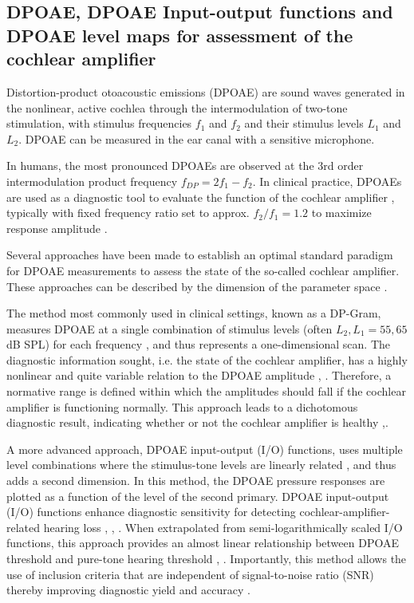\documentclass[journal,twoside,web]{ieeecolor2}
\begin{document}
\subsection{DPOAE, DPOAE Input-output functions and DPOAE level maps for assessment of the cochlear amplifier}
Distortion-product otoacoustic emissions (DPOAE) are sound waves generated in the nonlinear, active cochlea through the intermodulation of two-tone stimulation, with stimulus frequencies $f_1$ and $f_2$ and their stimulus levels $L_1$ and $L_2$.
DPOAE can be measured in the ear canal with a sensitive microphone.

In humans, the most pronounced DPOAEs are observed at the 3rd order intermodulation product frequency $f_{DP} = 2f_1 - f_2$.
In clinical practice, DPOAEs are used as a diagnostic tool to evaluate the function of the cochlear amplifier \cite{Ah2010}, typically with fixed frequency ratio set to approx. $f_2 / f_1 = 1.2$ to maximize response amplitude \cite{GK1990}.

Several approaches have been made to establish an optimal standard paradigm for DPOAE measurements to assess the state of the so-called cochlear amplifier.
These approaches can be described by the dimension of the parameter space \cite{Ms2002}.

The method most commonly used in clinical settings, known as a DP-Gram, measures DPOAE at a single combination of stimulus levels (often $L_2, L_1 = 55, 65$ dB SPL) for each frequency \cite{Ab2001}, and thus represents a one-dimensional scan.
The diagnostic information sought, i.e. the state of the cochlear amplifier, has a highly nonlinear and quite variable relation to the DPOAE amplitude \cite{Gr1996}, \cite{Bh2023}.
Therefore, a normative range is defined within which the amplitudes should fall if the cochlear amplifier is functioning normally.
This approach leads to a dichotomous diagnostic result, indicating whether or not the cochlear amplifier is healthy \cite{Pt1991},\cite{LM2003}.
 
A more advanced approach, DPOAE input-output (I/O) functions, uses multiple level combinations where the stimulus-tone levels are linearly related \cite{Km1998}, and thus adds a second dimension.
In this method, the DPOAE pressure responses are plotted as a function of the level of the second primary.
DPOAE input-output (I/O) functions enhance diagnostic sensitivity for detecting cochlear-amplifier-related hearing loss \cite{GK1990}, \cite{St1996}, \cite{GD2024}.
When extrapolated from semi-logarithmically scaled I/O functions, this approach provides an almost linear relationship between DPOAE threshold and pure-tone hearing threshold \cite{BJ2002}, \cite{GN2003}.
Importantly, this method allows the use of inclusion criteria that are independent of signal-to-noise ratio (SNR) thereby improving diagnostic yield and accuracy \cite{ZD2017}.
\end{document}

